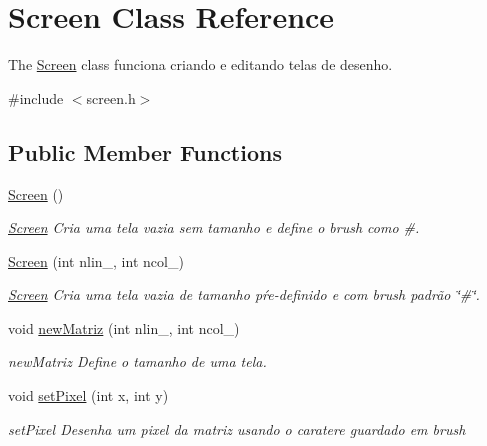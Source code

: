 \hypertarget{class_screen}{}\section{Screen Class Reference}
\label{class_screen}


The \hyperlink{class_screen}{Screen} class funciona criando e editando telas de desenho.  




{\ttfamily \#include $<$screen.\+h$>$}

\subsection*{Public Member Functions}
\begin{DoxyCompactItemize}
\item 
\mbox{\label{class_screen_ae7576476fc6e6a6eaa66389fdc41fe72}} 
\hyperlink{class_screen_ae7576476fc6e6a6eaa66389fdc41fe72}{Screen} ()
\begin{DoxyCompactList}\small\item\em \hyperlink{class_screen}{Screen} Cria uma tela vazia sem tamanho e define o brush como \textquotesingle{}\#\textquotesingle{}. \end{DoxyCompactList}\item 
\hyperlink{class_screen_ab41e0f2754e0a7831a8fc3211bcdabca}{Screen} (int nlin\+\_\+, int ncol\+\_\+)
\begin{DoxyCompactList}\small\item\em \hyperlink{class_screen}{Screen} Cria uma tela vazia de tamanho pŕe-\/definido e com brush padrão \char`\"{}\#\char`\"{}. \end{DoxyCompactList}\item 
void \hyperlink{class_screen_a12eef567d26f6cb00981da6384be2eac}{new\+Matriz} (int nlin\+\_\+, int ncol\+\_\+)
\begin{DoxyCompactList}\small\item\em new\+Matriz Define o tamanho de uma tela. \end{DoxyCompactList}\item 
void \hyperlink{class_screen_ae6bea81c57a22d226507c3c26fa95ee0}{set\+Pixel} (int x, int y)
\begin{DoxyCompactList}\small\item\em set\+Pixel Desenha um pixel da matriz usando o caratere guardado em \textquotesingle{}brush\textquotesingle{} \end{DoxyCompactList}\item 

\end{DoxyCompactItemize}
